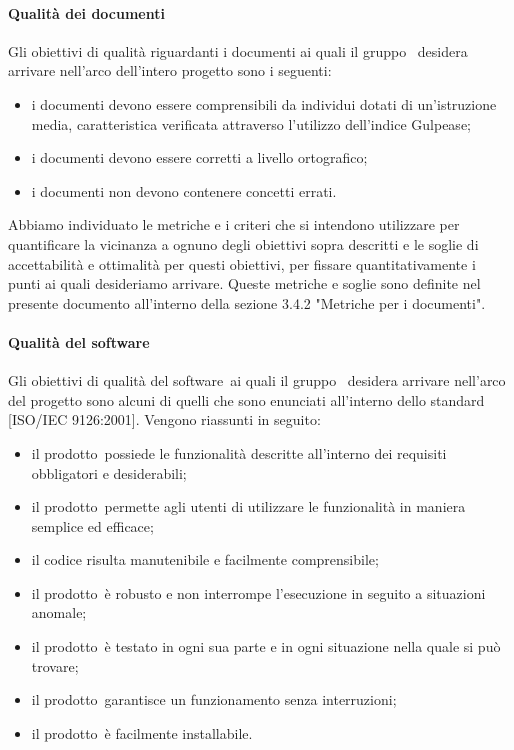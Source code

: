 \documentclass[../PianoDiQualifica.tex]{subfiles}
\begin{document}
			\paragraph{Qualità dei documenti}
			Gli obiettivi di qualità riguardanti i documenti ai quali il gruppo \leaf\ desidera arrivare nell'arco dell'intero progetto sono i seguenti:
			\begin{itemize}
				\item i documenti devono essere comprensibili da individui dotati di un'istruzione media, caratteristica verificata attraverso l'utilizzo dell'indice Gulpease\g;
				\item i documenti devono essere corretti a livello ortografico;
				\item i documenti non devono contenere concetti errati.
			\end{itemize}
			Abbiamo individuato le metriche e i criteri che si intendono utilizzare per quantificare la vicinanza a ognuno degli obiettivi sopra descritti e le soglie di accettabilità e ottimalità per questi obiettivi, per fissare quantitativamente i punti ai quali desideriamo arrivare. Queste metriche e soglie sono definite nel presente documento all'interno della sezione 3.4.2 "Metriche per i documenti".
			\paragraph{Qualità del software}
			Gli obiettivi di qualità del software\g\ ai quali il gruppo \leaf\ desidera arrivare nell'arco del progetto sono alcuni di quelli che sono enunciati all'interno dello standard [ISO/IEC 9126:2001]. Vengono riassunti in seguito:
			\begin{itemize}
				\item il prodotto\g\ possiede le funzionalità descritte all'interno dei requisiti obbligatori e desiderabili;
				\item il prodotto\g\ permette agli utenti di utilizzare le funzionalità in maniera semplice ed efficace;
				\item il codice risulta manutenibile e facilmente comprensibile;
				\item il prodotto\g\ è robusto e non interrompe l'esecuzione in seguito a situazioni anomale;
				\item il prodotto\g\ è testato in ogni sua parte e in ogni situazione nella quale si può trovare;
				\item il prodotto\g{}arantisce un funzionamento senza interruzioni;
				\item il prodotto\g\ è facilmente installabile.
			\end{itemize}
\end{document}
